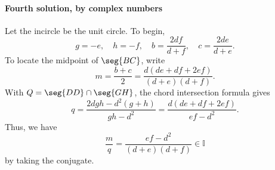 \paragraph{Fourth solution, by complex numbers} Let the incircle be the unit circle. To begin, \[g=-e,\quad h=-f,\quad b=\frac{2df}{d+f},\quad c=\frac{2de}{d+e}.\]
To locate the midpoint of $\seg{BC}$, write \[m=\frac{b+c}2=\frac{d(de+df+2ef)}{(d+e)(d+f)}.\]
With $Q=\seg{DD}\cap\seg{GH}$, the chord intersection formula gives \[q=\frac{2dgh-d^2(g+h)}{gh-d^2}=\frac{d(de+df+2ef)}{ef-d^2}.\]
Thus, we have \[\frac mq=\frac{ef-d^2}{(d+e)(d+f)}\in\mathbb I\]
by taking the conjugate.

